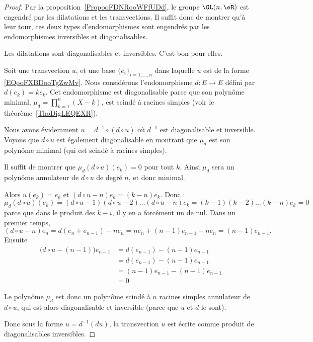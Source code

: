 \begin{proof}
	Par la proposition~\ref{PropooFDNRooWFfUDd}, le groupe \( \GL(n,\eR)\) est engendré par les dilatations et les transvections. Il suffit donc de montrer qu'à leur tour, ces deux types d'endomorphismes sont engendrés par les endomorphismes inversibles et diagonalisables.

	Les dilatations sont diagonalisables et inversibles. C'est bon pour elles.

	Soit une transvection \( u\), et une base \( \{ e_i \}_{i=1,\ldots, n}\) dans laquelle \( u\) est de la forme \eqref{EQooFXBDooTgZwMv}. Nous considérons l'endomorphisme \( d\colon E\to E\) défini par \( d(e_k)=ke_k\). Cet endomorphisme est diagonalisable parce que son polynôme minimal, \( \mu_d=\prod_{k=1}^n(X-k)\), est scindé à racines simples (voir le théorème~\ref{ThoDigLEQEXR}).

	Nous avons évidemment \( u= d^{-1}\circ(d\circ u) \) où \( d^{-1}\) est diagonalisable et inversible. Voyons que \( d\circ u\) est également diagonalisable en montrant que \( \mu_d\) est son polynôme minimal (qui est scindé à racines simples).

	Il suffit de montrer que \( \mu_d(d\circ u)(e_k)=0\) pour tout \( k\). Ainsi \( \mu_d\) sera un polynôme annulateur de \( d\circ u\) de degré \( n\), et donc minimal.
	\begin{subproof}
		\spitem[Si \( k\leq n-1\)]
		Alors \( u(e_k)=e_k\) et \( (d\circ u-n)e_k=(k-n)e_k\). Donc :
		\begin{equation}
			\mu_d(d\circ u)(e_k)=(d\circ u-1)(d\circ u-2)\ldots (d\circ u-n)e_k=(k-1)(k-2)\ldots (k-n)e_k=0
		\end{equation}
		parce que dans le produit des \( k-i\), il y en a forcément un de nul.
		\spitem[Si \( k=n\)]
		Dans un premier temps,
		\begin{equation}
			(d\circ u-n)e_n=d(e_n+e_{n-1})-ne_n=ne_n+(n-1)e_{n-1}-ne_n=(n-1)e_{n-1}.
		\end{equation}
		Ensuite
		\begin{subequations}
			\begin{align}
				\big( d\circ u-(n-1) \big)e_{n-1} & =d(e_{n-1})-(n-1)e_{n-1}   \\
				                                  & =d(e_{n-1})-(n-1)e_{n-1}   \\
				                                  & =(n-1)e_{n-1}-(n-1)e_{n-1} \\
				                                  & =0
			\end{align}
		\end{subequations}
	\end{subproof}
	Le polynôme \( \mu_d\) est donc un polynôme scindé à \( n\) racines simples annulateur de \( d\circ u\), qui est alors diagonalisable et inversible (parce que \( u\) et \( d\) le sont).

	Donc sous la forme \( u=d^{-1}(du)\), la transvection \( u\) est écrite comme produit de diagonalisables inversibles.
\end{proof}

